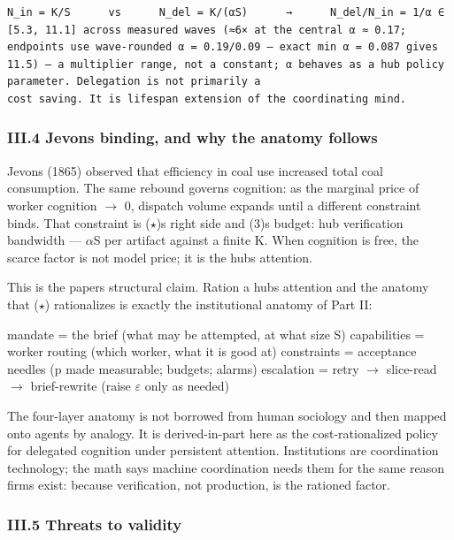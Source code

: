 \documentclass[
]{article}
\begin{document}
\begin{Verbatim}[breaklines,breakanywhere,fontsize=\small]
  N_in = K/S      vs      N_del = K/(αS)      →      N_del/N_in = 1/α ∈ [5.3, 11.1] across measured waves (≈6× at the central α ≈ 0.17; endpoints use wave-rounded α = 0.19/0.09 — exact min α = 0.087 gives 11.5) — a multiplier range, not a constant; α behaves as a hub policy parameter. Delegation is not primarily a
cost saving. It is lifespan extension of the coordinating mind.
\end{Verbatim}

\subsubsection{III.4 Jevons binding, and why the anatomy
follows}\label{iii4-jevons-binding-and-why-the-anatomy-follows}

Jevons (1865) observed that efficiency in coal use increased total coal
consumption. The same rebound governs cognition: as the marginal price
of worker cognition $\rightarrow$ 0, dispatch volume expands until a different
constraint binds. That constraint is ($\star$)\textquotesingle s right side
and (3)\textquotesingle s budget: hub verification bandwidth --- $\alpha$S per
artifact against a finite K. When cognition is free, the scarce factor
is not model price; it is the hub\textquotesingle s attention.

This is the paper\textquotesingle s structural claim. Ration a
hub\textquotesingle s attention and the anatomy that ($\star$) rationalizes is
exactly the institutional anatomy of Part II:

mandate = the brief (what may be attempted, at what size S) capabilities
= worker routing (which worker, what it is good at) constraints =
acceptance needles (p made measurable; budgets; alarms) escalation =
retry $\rightarrow$ slice-read $\rightarrow$ brief-rewrite (raise $\varepsilon$ only as needed)

The four-layer anatomy is not borrowed from human sociology and then
mapped onto agents by analogy. It is derived-in-part here as the
cost-rationalized policy for delegated cognition under persistent
attention. Institutions are coordination technology; the math says
machine coordination needs them for the same reason firms exist: because
verification, not production, is the rationed factor.

\subsubsection{III.5 Threats to
validity}\label{iii5-threats-to-validity}
\end{document}
